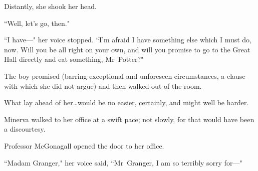 Distantly, she shook her head.

``Well, let's go, then."

``I have—" her voice stopped. ``I'm afraid I have something else which I must do, now. Will you be all right on your own, and will you promise to go to the Great Hall directly and eat something, Mr~Potter?"

The boy promised (barring exceptional and unforeseen circumstances, a clause with which she did not argue) and then walked out of the room.

What lay ahead of her…would be no easier, certainly, and might well be harder.

\later

Minerva walked to her office at a swift pace; not slowly, for that would have been a discourtesy.

Professor McGonagall opened the door to her office.

``Madam Granger," her voice said, ``Mr~Granger, I am so terribly sorry for—"

